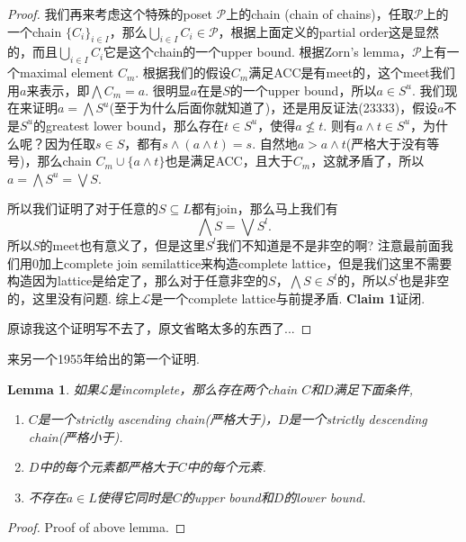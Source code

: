 \documentclass{article}
\newtheorem{lemma}[theorem]{Lemma}
\newcommand\lattice{\mathcal{L}}
\begin{document}
\begin{proof}
我们再来考虑这个特殊的poset $\mathcal{P}$上的chain (chain of chains)，任取$\mathcal{P}$上的一个chain $\{C_i\}_{i \in I}$，那么$\bigcup\limits_{i \in I} C_i \in \mathcal{P}$，根据上面定义的partial order这是显然的，而且$\bigcup\limits_{i \in I} C_i$它是这个chain的一个upper bound. 根据Zorn's lemma，$\mathcal{P}$上有一个maximal element $C_m$. {\color{blue} 根据我们的假设$C_m$满足ACC是有meet的}，这个meet我们用$a$来表示，即$\bigwedge C_m = a$. 很明显$a$在是$S$的一个upper bound，所以$a \in S^u$. {\color{blue} 我们现在来证明$a = \bigwedge S^u$}(至于为什么后面你就知道了)，还是用反证法(23333)，假设$a$不是$S^u$的greatest lower bound，那么存在$t \in S^u$，使得$a \nleq t$. 则有$a \wedge t \in S^u$，为什么呢？因为任取$s \in S$，都有$s \wedge (a \wedge t) = s$. 自然地$a > a \wedge t$(严格大于没有等号)，那么chain $C_m \cup \{a \wedge t\}$也是满足ACC，且大于$C_m$，这就矛盾了，所以$a = \bigwedge S^u = \bigvee S$. 

所以我们证明了对于任意的$S \subseteq L$都有join，那么马上我们有
$$
\bigwedge S = \bigvee S^l.
$$
所以$S$的meet也有意义了，但是这里$S^l$我们不知道是不是非空的啊? 注意最前面我们用0加上complete join semilattice来构造complete lattice，但是我们这里不需要构造因为lattice是给定了，那么对于任意非空的$S$，$\bigwedge S \in S^l$的，所以$S^l$也是非空的，这里没有问题. 综上$\lattice$是一个complete lattice与前提矛盾. \textbf{Claim 1}证闭.

原谅我这个证明写不去了，原文省略太多的东西了...
\end{proof}

{\color{red} 来另一个1955年给出的第一个证明}.

\begin{lemma}
如果$\lattice$是incomplete，那么存在两个chain $C$和$D$满足下面条件,
\begin{enumerate}
	\item $C$是一个strictly ascending chain(严格大于)，$D$是一个strictly descending chain(严格小于).
	\item $D$中的每个元素都严格大于$C$中的每个元素.
	\item 不存在$a \in L$使得它同时是$C$的upper bound和$D$的lower bound. 
\end{enumerate}
\end{lemma}

\begin{proof}
Proof of above lemma.
\end{proof}
\end{document}
